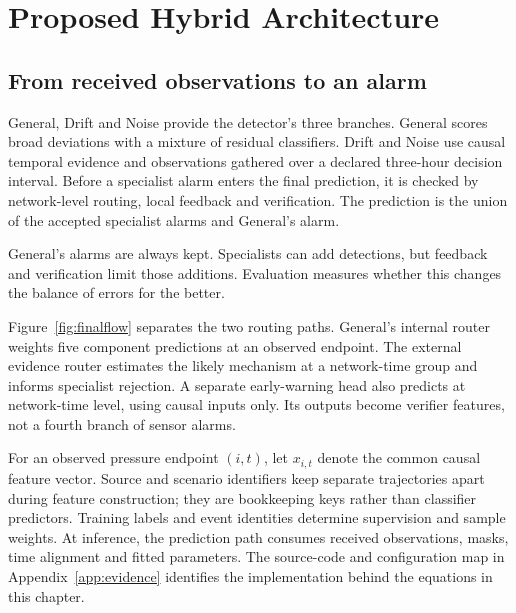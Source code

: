 \chapter{Proposed Hybrid Architecture}
\label{ch:architecture}

\section{From received observations to an alarm}
General, Drift and Noise provide the detector's three branches. General scores broad deviations with a mixture of residual classifiers. Drift and Noise use causal temporal evidence and observations gathered over a declared three-hour decision interval. Before a specialist alarm enters the final prediction, it is checked by network-level routing, local feedback and verification. The prediction is the union of the accepted specialist alarms and General's alarm.

General's alarms are always kept. Specialists can add detections, but feedback and verification limit those additions. Evaluation measures whether this changes the balance of errors for the better.

Figure~\ref{fig:finalflow} separates the two routing paths. General's internal router weights five component predictions at an observed endpoint. The external evidence router estimates the likely mechanism at a network-time group and informs specialist rejection. A separate early-warning head also predicts at network-time level, using causal inputs only. Its outputs become verifier features, not a fourth branch of sensor alarms.


For an observed pressure endpoint $(i,t)$, let $x_{i,t}$ denote the common causal feature vector. Source and scenario identifiers keep separate trajectories apart during feature construction; they are bookkeeping keys rather than classifier predictors. Training labels and event identities determine supervision and sample weights. At inference, the prediction path consumes received observations, masks, time alignment and fitted parameters. The source-code and configuration map in Appendix~\ref{app:evidence} identifies the implementation behind the equations in this chapter.

